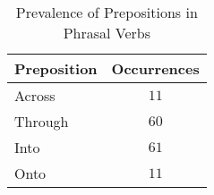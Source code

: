
\begin{table}[ht]
\centering
\caption{Prevalence of Prepositions in Phrasal Verbs}
\label{tab:prevalence}
\begin{tabular}{@{}lc@{}}
\toprule
\textbf{Preposition} & \textbf{Occurrences} \\
\midrule
Across & $11$ \\
Through & $60$ \\
Into & $61$ \\
Onto & $11$ \\

\bottomrule
\end{tabular}
\end{table}
